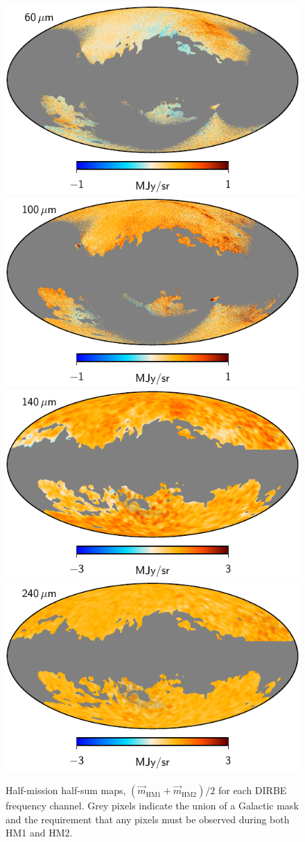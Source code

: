\documentclass{aa}
\newcommand{\m}[0]{\vec{m}}
\begin{document}
\begin{figure}
  \includegraphics[width=0.40\linewidth]{figs/dirbe_07_hmhs_v1.pdf}\hspace*{5mm}
  \includegraphics[width=0.40\linewidth]{figs/dirbe_08_hmhs_v1.pdf}\\
  \includegraphics[width=0.40\linewidth]{figs/dirbe_09_hmhs_v1_3deg.pdf}\hspace*{5mm}
  \includegraphics[width=0.40\linewidth]{figs/dirbe_10_hmhs_v1_3deg.pdf}
  \caption{Half-mission half-sum maps, $(\m_{\mathrm{HM1}}+\m_{\mathrm{HM2}})/2$ for each DIRBE frequency channel. Grey pixels indicate the union of a Galactic mask and the requirement that any pixels must be observed during both HM1 and HM2. }
  \label{fig:hmhs}
\end{figure}
\end{document}
